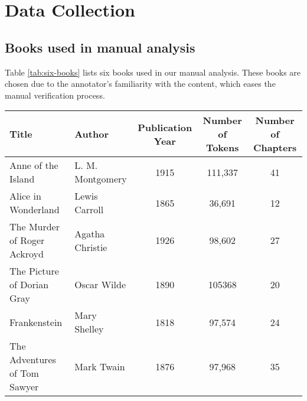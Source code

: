 \newpage
\appendix
\section{Data Collection}

\subsection{Books used in manual analysis}
Table \ref{tab:six-books} lists six books used in our manual analysis. These books are chosen due to the annotator's familiarity with the content, which eases the manual verification process. 
\begin{table*}[htbp]
    \small
    \centering
    \begin{tabular}{llccc}
        \toprule
        Title & Author & Publication Year & Number of Tokens & Number of Chapters \\
        \midrule
        Anne of the Island & L. M. Montgomery & 1915 & 111,337& 41 \\
        Alice in Wonderland & Lewis Carroll & 1865 & 36,691 & 12 \\
        The Murder of Roger Ackroyd & Agatha Christie & 1926 & 98,602 & 27 \\
        The Picture of Dorian Gray & Oscar Wilde & 1890 & 105368 & 20\\
        Frankenstein & Mary Shelley & 1818 & 97,574 & 24\\
        The Adventures of Tom Sawyer & Mark Twain & 1876 & 97,968 & 35 \\
        \bottomrule
    \end{tabular}
    \caption{Six books used in our manual analysis. Books are chosen due to familiarity with the content.}
    \label{tab:six-books}
\end{table*}

